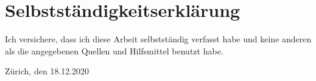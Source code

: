 \section*{Selbstständigkeitserklärung}

\setlength{\parindent}{0em}

\vspace{3\baselineskip}
Ich versichere, dass ich diese Arbeit selbstst\"{a}ndig verfasst habe und keine
anderen als die angegebenen Quellen und Hilfsmittel benutzt habe.\par
\vspace{4\baselineskip}

Zürich, den 18.12.2020 \hspace{3cm}\dotfill
